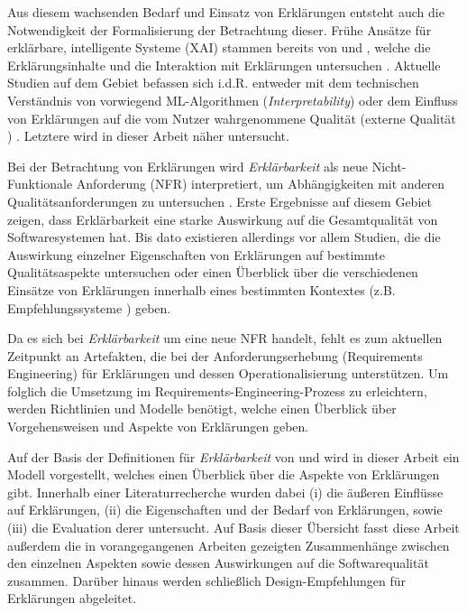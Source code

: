 Aus diesem wachsenden Bedarf und Einsatz von Erklärungen entsteht auch die Notwendigkeit der Formalisierung der Betrachtung dieser. Frühe Ansätze für erklärbare, intelligente Systeme (XAI) stammen bereits von \citeauthor{byrne1991construction} und \citeauthor{cawsey1991generating}, welche die Erklärungsinhalte \cite{byrne1991construction} und die Interaktion mit Erklärungen untersuchen \cite{cawsey1991generating}. Aktuelle Studien auf dem Gebiet befassen sich i.d.R. entweder mit dem technischen Verständnis von vorwiegend ML-Algorithmen (\textit{Interpretability}) \cite{gilpin_explaining_2018, fong_interpretable_2017, samek_towards_2019} oder dem Einfluss von Erklärungen auf die vom Nutzer wahrgenommene Qualität (externe Qualität \cite{international2011iso}) \cite{nunes_systematic_2017,kouki_user_2017,chazette_end-users_nodate}. Letztere wird in dieser Arbeit näher untersucht.

Bei der Betrachtung von Erklärungen wird \textit{Erklärbarkeit} als neue Nicht-Funktionale Anforderung (NFR) interpretiert, um Abhängigkeiten mit anderen Qualitätsanforderungen zu untersuchen \cite{kohl_explainability_2019, chazette2020explainability}. Erste Ergebnisse auf diesem Gebiet zeigen, dass Erklärbarkeit eine starke Auswirkung auf die Gesamtqualität von Softwaresystemen hat. Bis dato existieren allerdings vor allem Studien, die die Auswirkung einzelner Eigenschaften von Erklärungen auf bestimmte Qualitätsaspekte untersuchen oder einen Überblick über die verschiedenen Einsätze von Erklärungen innerhalb eines bestimmten Kontextes (z.B. Empfehlungssysteme \cite{nunes_systematic_2017}) geben.

Da es sich bei \textit{Erklärbarkeit} um eine neue NFR handelt, fehlt es zum aktuellen Zeitpunkt an Artefakten, die bei der Anforderungserhebung (Requirements Engineering) für Erklärungen und dessen Operationalisierung unterstützen. Um folglich die Umsetzung im Requirements-Engineering-Prozess zu erleichtern, werden Richtlinien und Modelle benötigt, welche einen Überblick über Vorgehensweisen und Aspekte von Erklärungen geben. 

Auf der Basis der Definitionen für \textit{Erklärbarkeit} von \citeauthor[]{chazette_knowledge_nodate} und \citeauthor[]{kohl_explainability_2019} wird in dieser Arbeit ein Modell vorgestellt, welches einen Überblick über die Aspekte von Erklärungen gibt. Innerhalb einer Literaturrecherche wurden dabei (i) die äußeren Einflüsse auf Erklärungen, (ii) die Eigenschaften und der Bedarf von Erklärungen, sowie (iii) die Evaluation derer untersucht. Auf Basis dieser Übersicht fasst diese Arbeit außerdem die in vorangegangenen Arbeiten gezeigten Zusammenhänge zwischen den einzelnen Aspekten sowie dessen Auswirkungen auf die Softwarequalität zusammen. Darüber hinaus werden schließlich Design-Empfehlungen für Erklärungen abgeleitet.

